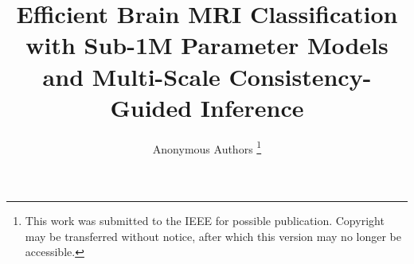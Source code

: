 \documentclass[journal]{IEEEtran}
\begin{document}
\title{Efficient Brain MRI Classification with Sub-1M Parameter Models and Multi-Scale Consistency-Guided Inference}

\author{Anonymous Authors
\thanks{This work was submitted to the IEEE for possible publication. Copyright may be transferred without notice, after which this version may no longer be accessible.}
}


\maketitle


\IEEEpeerreviewmaketitle








\end{document}
